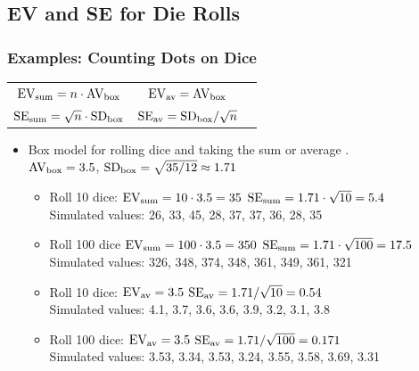 \documentclass[t]{beamer}
\begin{document}
\subsection{EV and SE for Die Rolls}
\begin{frame}
\frametitle{Examples: Counting Dots on Dice}

\footnotesize
 \begin{center}
\begin{tabular}{ccc}
{\color{blue}$\mbox{EV}_{\scriptsize\mbox{sum}} = n\cdot \mbox{AV}_{\scriptsize\mbox{box}}$} &\hspace{.5in}
{\color{darkgreen}$\mbox{EV}_{\scriptsize\mbox{av}} = \mbox{AV}_{\scriptsize\mbox{box}}$} \\[5pt]
{\color{blue}$\mbox{SE}_{\scriptsize\mbox{sum}} = \sqrt{n}\cdot \mbox{SD}_{\scriptsize\mbox{box}}$} &\hspace{.5in}
{\color{darkgreen}$\mbox{SE}_{\scriptsize\mbox{av}} = \mbox{SD}_{\scriptsize\mbox{box}}/\sqrt{n}$}
\end{tabular}
\end{center}

\begin{itemize}
\item Box model for rolling dice and taking the sum or average
. \\ $\mbox{AV}_{\mbox{\scriptsize box}} = 3.5$,
   $\mbox{SD}_{\mbox{\scriptsize box}} = \sqrt{35/12}\approx 1.71$
  \begin{itemize}
  \item<2-> \footnotesize {\color{blue}Roll 10 dice:  $\mbox{EV}_{\scriptsize\mbox{sum}} = 10\cdot 3.5 = 35$
     $\mbox{SE}_{\scriptsize\mbox{sum}} = 1.71\cdot \sqrt{10} = 5.4$}\\
   Simulated values: 26, 33, 45, 28, 37, 37, 36, 28, 35\vspace{3pt}
%
\item<3-> {\color{blue}Roll 100 dice  $\mbox{EV}_{\scriptsize\mbox{sum}} = 100\cdot 3.5 = 350$
     $\mbox{SE}_{\scriptsize\mbox{sum}} = 1.71\cdot \sqrt{100} = 17.5$}\\
   Simulated values: 326, 348, 374, 348, 361, 349, 361, 321\vspace{5pt}
%
  \item<4-> \footnotesize {\color{darkgreen}Roll 10 dice:  $\mbox{EV}_{\scriptsize\mbox{av}} =3.5$
     $\mbox{SE}_{\scriptsize\mbox{av}} = 1.71/ \sqrt{10} = 0.54$}\\
   Simulated values: 4.1, 3.7, 3.6, 3.6, 3.9, 3.2, 3.1, 3.8\vspace{3pt}
  \item<5-> \footnotesize {\color{darkgreen}Roll 100 dice:  $\mbox{EV}_{\scriptsize\mbox{av}} =3.5$
     $\mbox{SE}_{\scriptsize\mbox{av}} = 1.71/ \sqrt{100} = 0.171$}\\
   Simulated values: 3.53, 3.34, 3.53, 3.24, 3.55, 3.58, 3.69, 3.31\vspace{3pt}
  \end{itemize}
\end{itemize}
\end{frame}
\end{document}
